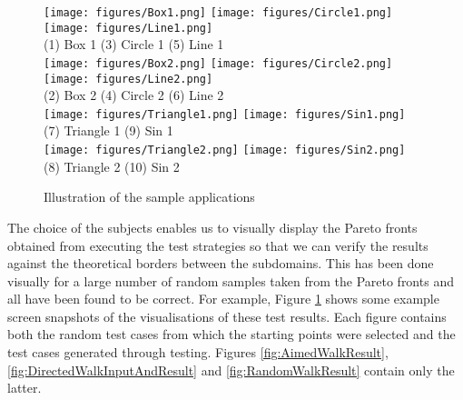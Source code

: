 \documentclass[preprint,1p,authoryear,times]{elsarticle}
\begin{document}
\begin{figure}[htbp]
\centering

\texttt{[image: figures/Box1.png]} \hspace{0.5cm}
\texttt{[image: figures/Circle1.png]} \hspace{0.5cm}
\texttt{[image: figures/Line1.png]}\\
\scriptsize{(1) Box 1} \hspace{3.5cm} \scriptsize{(3) Circle 1} \hspace{3.5cm} \scriptsize{(5) Line 1} \\

\texttt{[image: figures/Box2.png]} \hspace{0.5cm}
\texttt{[image: figures/Circle2.png]} \hspace{0.5cm}
\texttt{[image: figures/Line2.png]}\\
\scriptsize{(2) Box 2} \hspace{3.5cm} \scriptsize{(4) Circle 2} \hspace{3.5cm} \scriptsize{(6) Line 2}\\

\texttt{[image: figures/Triangle1.png]} \hspace{1cm}
\texttt{[image: figures/Sin1.png]}\\
\scriptsize{(7) Triangle 1} \hspace{4cm} \scriptsize{(9) Sin 1} \\

\texttt{[image: figures/Triangle2.png]} \hspace{1cm}
\texttt{[image: figures/Sin2.png]}\\
\scriptsize{(8) Triangle 2} \hspace{4cm} \scriptsize{(10) Sin 2}
\caption{Illustration of the sample applications}
\label{fig:SampleApplications}
\end{figure}

The choice of the subjects enables us to visually display the Pareto fronts obtained from executing the test strategies so that we can verify the results against the theoretical borders between the subdomains. This has been done visually for a large number of random samples taken from the Pareto fronts and all have been found to be correct. For example, Figure \ref{fig:SampleApplications} shows some example screen snapshots of the visualisations of these test results. Each figure contains both the random test cases from which the starting points were selected and the test cases generated through testing. Figures \ref{fig:AimedWalkResult}, \ref{fig:DirectedWalkInputAndResult} and \ref{fig:RandomWalkResult} contain only the latter. 
\end{document}
